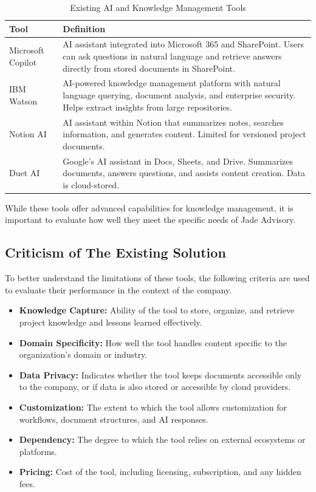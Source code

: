 \begin{table}[H]
    \centering
    \caption{Existing AI and Knowledge Management Tools}
    \renewcommand{\arraystretch}{1.2}
    \begin{tabular}{|l|p{10cm}|}
        \hline
        \textbf{Tool} & \textbf{Definition} \\
        \hline
        Microsoft Copilot \cite{copilot} & AI assistant integrated into Microsoft 365
        and SharePoint. Users can ask questions in natural language and retrieve
        answers directly from stored documents in SharePoint. \\
        \hline
        IBM Watson \cite{ibmwatson} & AI-powered knowledge management platform with
        natural language querying, document analysis, and enterprise security.
        Helps extract insights from large repositories. \\
        \hline
        Notion AI \cite{notionai} & AI assistant within Notion that summarizes notes,
        searches information, and generates content. Limited for versioned project
        documents. \\
        \hline
        Duet AI \cite{duetai} & Google's AI assistant in Docs, Sheets, and Drive.
        Summarizes documents, answers questions, and assists content creation.
        Data is cloud-stored. \\
        \hline
    \end{tabular}
    \label{tab:tools_definition}
\end{table}

While these tools offer advanced capabilities for knowledge management, it is
important to evaluate how well they meet the specific needs of Jade Advisory.

\subsection{Criticism of The Existing Solution}
To better understand the limitations of these tools, the following criteria
are used to evaluate their performance in the context of the company.

\begin{itemize}
    \item \textbf{Knowledge Capture:} Ability of the tool to store, organize,
    and retrieve project knowledge and lessons learned effectively.
    \item \textbf{Domain Specificity:} How well the tool handles content
    specific to the organization's domain or industry.
    \item \textbf{Data Privacy:} Indicates whether the tool keeps documents
    accessible only to the company, or if data is also stored or accessible
    by cloud providers.
    \item \textbf{Customization:} The extent to which the tool allows
    customization for workflows, document structures, and AI responses.
    \item \textbf{Dependency:} The degree to which the tool relies on
    external ecosystems or platforms.
    \item \textbf{Pricing:} Cost of the tool, including licensing,
    subscription, and any hidden fees.
\end{itemize}

